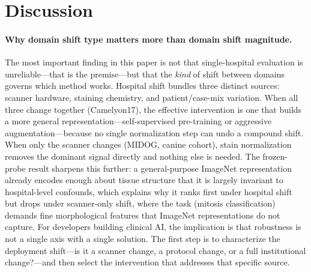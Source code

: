 \documentclass[10pt]{article} %
\begin{document}
\section{Discussion}
\label{sec:discussion}

\paragraph{Why domain shift type matters more than domain shift magnitude.}
The most important finding in this paper is not that single-hospital evaluation
is unreliable---that is the premise---but that the \emph{kind} of shift
between domains governs which method works. Hospital shift bundles three
distinct sources: scanner hardware, staining chemistry, and patient/case-mix
variation. When all three change together (Camelyon17), the effective
intervention is one that builds a more general representation---self-supervised
pre-training or aggressive augmentation---because no single normalization step
can undo a compound shift. When only the scanner changes (MIDOG, canine
cohort), stain normalization removes the dominant signal directly and nothing
else is needed. The frozen-probe result sharpens this further: a
general-purpose ImageNet representation already encodes enough about tissue
structure that it is largely invariant to hospital-level confounds, which
explains why it ranks first under hospital shift but drops under scanner-only
shift, where the task (mitosis classification) demands fine morphological
features that ImageNet representations do not capture. For developers building
clinical AI, the implication is that robustness is not a single axis with a
single solution. The first step is to characterize the deployment shift---is it
a scanner change, a protocol change, or a full institutional change?---and
then select the intervention that addresses that specific source.
\end{document}
